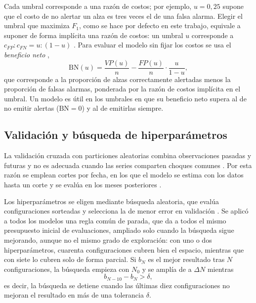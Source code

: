 Cada umbral corresponde a una razón de costos; por ejemplo, $u=0{,}25$ supone que el costo de no alertar un alza es tres veces el de una falsa alarma. Elegir el umbral que maximiza $F_1$, como se hace por defecto en este trabajo, equivale a suponer de forma implícita una razón de costos: un umbral $u$ corresponde a $c_{FP}:c_{FN}=u:(1-u)$ \citep{lipton2014}. Para evaluar el modelo sin fijar los costos se usa el \emph{beneficio neto} \citep{vickers2006},
\begin{equation}
\mathrm{BN}(u)=\frac{VP(u)}{n}-\frac{FP(u)}{n}\cdot\frac{u}{1-u},
\label{eq:bn}
\end{equation}
que corresponde a la proporción de alzas correctamente alertadas menos la proporción de falsas alarmas, ponderada por la razón de costos implícita en el umbral. Un modelo es útil en los umbrales en que su beneficio neto supera al de no emitir alertas ($\mathrm{BN}=0$) y al de emitirlas siempre.

\subsection{Validación y búsqueda de hiperparámetros}
\label{sec:validacion}

La validación cruzada con particiones aleatorias combina observaciones pasadas y futuras y no es adecuada cuando las series comparten choques comunes \citep{bergmeir2018}. Por esta razón se emplean cortes por fecha, en los que el modelo se estima con los datos hasta un corte y se evalúa en los meses posteriores \citep{tashman2000}.

Los hiperparámetros se eligen mediante búsqueda aleatoria, que evalúa configuraciones sorteadas y selecciona la de menor error en validación \citep{bergstra2012}. Se aplicó a todos los modelos una regla común de parada, que da a todos el mismo presupuesto inicial de evaluaciones, ampliado solo cuando la búsqueda sigue mejorando, aunque no el mismo grado de exploración: con uno o dos hiperparámetros, cuarenta configuraciones cubren bien el espacio, mientras que con siete lo cubren solo de forma parcial. Si $b_N$ es el mejor resultado tras $N$ configuraciones, la búsqueda empieza con $N_0$ y se amplía de a $\Delta N$ mientras
\begin{equation}
b_{N-10}-b_N>\delta ,
\label{eq:convergencia}
\end{equation}
es decir, la búsqueda se detiene cuando las últimas diez configuraciones no mejoran el resultado en más de una tolerancia $\delta$.

